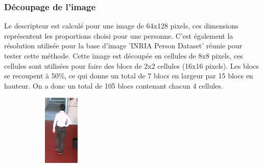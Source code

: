 \documentclass[11pt]{article}
\begin{document}
\subsubsection{Découpage de l'image}
Le descripteur est calculé pour une image de 64x128 pixels, ces dimensions représentent les proportions choisi pour une personne. C'est également la résolution utilisée pour la base d'image 'INRIA Person Dataset' réunie pour tester cette méthode.
Cette image est découpée en cellules de 8x8 pixels, ces cellules sont utilisées pour faire des blocs de 2x2 cellules (16x16 pixels). Les blocs se recoupent à 50\%, ce qui donne un total de 7 blocs en largeur par 15 blocs en hauteur. On a donc un total de 105 blocs contenant chacun 4 cellules.
\\
\begin{figure}[!ht]
\centering
\begin{subfigure}{.3\textwidth}
  \centering
  \includegraphics[width=.8\linewidth]{person.png}

\end{subfigure}
\end{figure}
\end{document}
